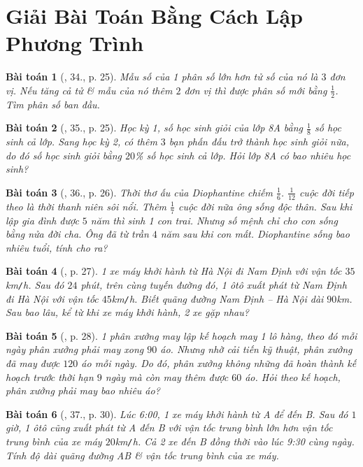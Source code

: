 \documentclass{article}
\newtheorem{baitoan}{Bài toán}
\begin{document}
\section{Giải Bài Toán Bằng Cách Lập Phương Trình}

\begin{baitoan}[\cite{SGK_Toan_8_tap_2}, 34., p. 25]
	Mẫu số của 1 phân số lớn hơn tử số của nó là $3$ đơn vị. Nếu tăng cả tử \& mẫu của nó thêm $2$ đơn vị thì được phân số mới bằng $\frac{1}{2}$. Tìm phân số ban đầu.
\end{baitoan}

\begin{baitoan}[\cite{SGK_Toan_8_tap_2}, 35., p. 25]
	Học kỳ 1, số học sinh giỏi của lớp 8A bằng $\frac{1}{8}$ số học sinh cả lớp. Sang học kỳ 2, có thêm $3$ bạn phấn đấu trở thành học sinh giỏi nữa, do đó số học sinh giỏi bằng $20$\% số học sinh cả lớp. Hỏi lớp 8A có bao nhiêu học sinh?
\end{baitoan}

\begin{baitoan}[\cite{SGK_Toan_8_tap_2}, 36., p. 26]
	Thời thơ ấu của Diophantine chiếm $\frac{1}{6}$. $\frac{1}{12}$ cuộc đời tiếp theo là thời thanh niên sôi nổi. Thêm $\frac{1}{7}$ cuộc đời nữa ông sống độc thân. Sau khi lập gia đình được $5$ năm thì sinh 1 con trai. Nhưng số mệnh chỉ cho con sống bằng nửa đời cha. Ông đã từ trần $4$ năm sau khi con mất. Diophantine sống bao nhiêu tuổi, tính cho ra?
\end{baitoan}

\begin{baitoan}[\cite{SGK_Toan_8_tap_2}, p. 27]
	1 xe máy khởi hành từ Hà Nội đi Nam Định với vận tốc $35$\emph{km\texttt{/}h}. Sau đó $24$ phút, trên cùng tuyến đường đó, 1 ôtô xuất phát từ Nam Định đi Hà Nội với vận tốc $45$\emph{km\texttt{/}h}. Biết quãng đường Nam Định -- Hà Nội dài $90$\emph{km}. Sau bao lâu, kể từ khi xe máy khởi hành, 2 xe gặp nhau?
\end{baitoan}

\begin{baitoan}[\cite{SGK_Toan_8_tap_2}, p. 28]
	1 phân xưởng may lập kế hoạch may 1 lô hàng, theo đó mỗi ngày phân xưởng phải may xong $90$ áo. Nhưng nhờ cải tiến kỹ thuật, phân xưởng đã may được $120$ áo mỗi ngày. Do đó, phân xưởng không những đã hoàn thành kế hoạch trước thời hạn $9$ ngày mà còn may thêm được $60$ áo. Hỏi theo kế hoạch, phân xưởng phải may bao nhiêu áo?
\end{baitoan}

\begin{baitoan}[\cite{SGK_Toan_8_tap_2}, 37., p. 30]
	Lúc 6:00, 1 xe máy khởi hành từ A để đến B. Sau đó $1$ giờ, 1 ôtô cũng xuất phát từ A đến B với vận tốc trung bình lớn hơn vận tốc trung bình của xe máy $20$\emph{km\texttt{/}h}. Cả 2 xe đến B đồng thời vào lúc 9:30 cùng ngày. Tính độ dài quãng đường AB \& vận tốc trung bình của xe máy.
\end{baitoan}
\end{document}
